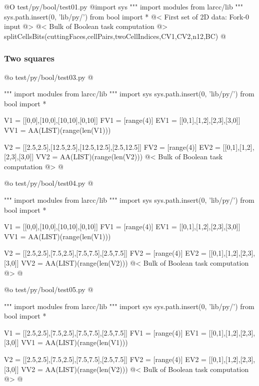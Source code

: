 \documentclass[11pt,oneside]{article}	%
\begin{document}
@O test/py/bool/test01.py
@{import sys
""" import modules from larcc/lib """
sys.path.insert(0, 'lib/py/')
from bool import *
@< First set of 2D data: Fork-0 input @>
@< Bulk of Boolean task computation @>
splitCellsBits(cuttingFaces,cellPairs,twoCellIndices,CV1,CV2,n12,BC)
@}


\subsubsection{Two squares}




@o test/py/bool/test03.py
@{""" import modules from larcc/lib """
import sys
sys.path.insert(0, 'lib/py/')
from bool import *

V1 = [[0,0],[10,0],[10,10],[0,10]]
FV1 = [range(4)]
EV1 = [[0,1],[1,2],[2,3],[3,0]]
VV1 = AA(LIST)(range(len(V1)))

V2 = [[2.5,2.5],[12.5,2.5],[12.5,12.5],[2.5,12.5]]
FV2 = [range(4)]
EV2 = [[0,1],[1,2],[2,3],[3,0]]
VV2 = AA(LIST)(range(len(V2)))
@< Bulk of Boolean task computation @>
@}


@o test/py/bool/test04.py
@{""" import modules from larcc/lib """
import sys
sys.path.insert(0, 'lib/py/')
from bool import *

V1 = [[0,0],[10,0],[10,10],[0,10]]
FV1 = [range(4)]
EV1 = [[0,1],[1,2],[2,3],[3,0]]
VV1 = AA(LIST)(range(len(V1)))

V2 = [[2.5,2.5],[7.5,2.5],[7.5,7.5],[2.5,7.5]]
FV2 = [range(4)]
EV2 = [[0,1],[1,2],[2,3],[3,0]]
VV2 = AA(LIST)(range(len(V2)))
@< Bulk of Boolean task computation @>
@}

@o test/py/bool/test05.py
@{""" import modules from larcc/lib """
import sys
sys.path.insert(0, 'lib/py/')
from bool import *

V1 = [[2.5,2.5],[7.5,2.5],[7.5,7.5],[2.5,7.5]]
FV1 = [range(4)]
EV1 = [[0,1],[1,2],[2,3],[3,0]]
VV1 = AA(LIST)(range(len(V1)))

V2 = [[2.5,2.5],[7.5,2.5],[7.5,7.5],[2.5,7.5]]
FV2 = [range(4)]
EV2 = [[0,1],[1,2],[2,3],[3,0]]
VV2 = AA(LIST)(range(len(V2)))
@< Bulk of Boolean task computation @>
@}
\end{document}
